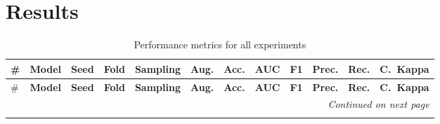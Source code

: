 \documentclass[a4paper,10pt]{book}
\begin{document}
\chapter{Results}



\begin{scriptsize}
\begin{longtable}{@{}l l c c l c c c c c c c@{}}
\caption{Performance metrics for all experiments}\label{tab:complete_metrics}\\
\toprule
\# & \textbf{Model} & \textbf{Seed} & \textbf{Fold} & \textbf{Sampling} & \textbf{Aug.} &
\textbf{Acc.} & \textbf{AUC} & \textbf{F1} & \textbf{Prec.} & \textbf{Rec.} & \textbf{C.\ Kappa}\\
\midrule
\endfirsthead

\toprule
\# & \textbf{Model} & \textbf{Seed} & \textbf{Fold} & \textbf{Sampling} & \textbf{Aug.} &
\textbf{Acc.} & \textbf{AUC} & \textbf{F1} & \textbf{Prec.} & \textbf{Rec.} & \textbf{C.\ Kappa}\\
\midrule
\endhead

\midrule
\multicolumn{12}{r}{\textit{Continued on next page}}\\
\midrule
\endfoot


\end{longtable}
\end{scriptsize}
\end{document}
